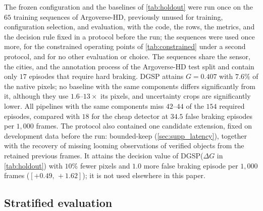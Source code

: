 \documentclass[10pt,letterpaper]{article}
\newcommand{\method}{DGSP\xspace}
\newcommand{\G}{G}
\newcommand{\ci}[2]{[#1,\allowbreak\,#2]}
\theoremstyle{remark}
\theoremstyle{plain}
\theoremstyle{definition}
\begin{document}
The frozen configuration and the baselines of \cref{tab:holdout} were run once on the $65$ training sequences of Argoverse-HD, previously unused for training, configuration selection, and evaluation, with the code, the rows, the metrics, and the decision rule fixed in a protocol before the run; the sequences were used once more, for the constrained operating points of \cref{tab:constrained} under a second protocol, and for no other evaluation or choice.
The sequences share the sensor, the cities, and the annotation process of the Argoverse-HD test split and contain only $17$ episodes that require hard braking.
\method attains $\G=0.407$ with $7.6\%$ of the native pixels; no baseline with the same components differs significantly from it, although they use $1.6$--$13\times$ its pixels, and uncertainty crops are significantly lower.
All pipelines with the same components miss $42$--$44$ of the $154$ required episodes, compared with $18$ for the cheap detector at $34.5$ false braking episodes per $1{,}000$ frames.
The protocol also contained one candidate extension, fixed on development data before the run: bounded-keep (\cref{sec:supp_latency}), together with the recovery of missing looming observations of verified objects from the retained previous frames.
It attains the decision value of \method ($\Delta\G$ in \cref{tab:holdout}) with $10\%$ fewer pixels and $1.0$ more false braking episode per $1{,}000$ frames ($\ci{+0.49}{+1.62}$); it is not used elsewhere in this paper.

\subsection{Stratified evaluation}
\label{sec:supp_strata}
\end{document}
